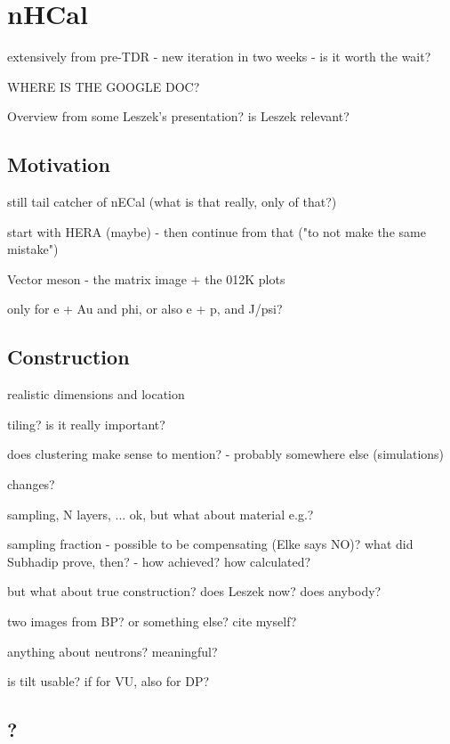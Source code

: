 \chapter{nHCal}\label{cha:nHCal} %
extensively from pre-TDR - new iteration in two weeks - is it worth the wait?

WHERE IS THE GOOGLE DOC? 

Overview from some Leszek's presentation? is Leszek relevant?

\section{Motivation}
still tail catcher of nECal (what is that really, only of that?)

start with HERA (maybe) - then continue from that ("to not make the same mistake")

Vector meson - the matrix image + the 012K plots

only for e + Au and phi, or also e + p, and J/psi?

\section{Construction}
realistic dimensions and location

tiling? is it really important?

does clustering make sense to mention? - probably somewhere else (simulations)

changes?

sampling, N layers, ... ok, but what about material e.g.?

sampling fraction - possible to be compensating (Elke says NO)? what did Subhadip prove, then? - how achieved? how calculated?

but what about true construction? does Leszek now? does anybody?

two images from BP? or something else? cite myself?

anything about neutrons? meaningful?

is tilt usable? if for VU, also for DP?

\section{?}




